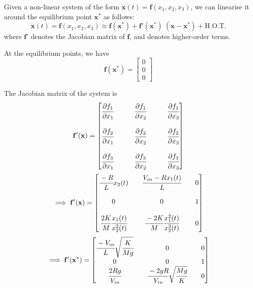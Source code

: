 Given a non-linear system of the form \( \mathbf{\dot x}(t) = \mathbf{f}(x_1, x_2, x_3) \), we can linearise it around the equilibrium point \( \mathbf{x^*} \) as follows:
\[
    \mathbf{\dot x}(t) = \mathbf{f}(x_1, x_2, x_3) \approx \mathbf{f}(\mathbf{x^*}) + \mathbf{f'}(\mathbf{x^*})\; (\mathbf{x} - \mathbf{x^*}) + \text{H.O.T.}
\]
where \(\mathbf{f'}\) denotes the Jacobian matrix of \(\mathbf{f}\), and  denotes higher-order terms.

At the equilibrium points, we have
\[
    \mathbf{f}(\mathbf{x^*}) =
    \begin{bmatrix}
        0 \\
        0 \\
        0
    \end{bmatrix}
\]

The Jacobian matrix of the system is
\[
    \mathbf{f'}(\mathbf{x}) =
    \begin{bmatrix}
        \cfrac{\partial f_1}{\partial x_1} &  &  & \cfrac{\partial f_1}{\partial x_2} &  &  & \cfrac{\partial f_1}{\partial x_3} \\
        \\
        \cfrac{\partial f_2}{\partial x_1} &  &  & \cfrac{\partial f_2}{\partial x_2} &  &  & \cfrac{\partial f_2}{\partial x_3} \\
        \\
        \cfrac{\partial f_3}{\partial x_1} &  &  & \cfrac{\partial f_3}{\partial x_2} &  &  & \cfrac{\partial f_3}{\partial x_3} \\
    \end{bmatrix}
\]
\[
    \implies
    \mathbf{f'}(\mathbf{x}) =
    \begin{bmatrix}
        \cfrac{-R}{L}x_2(t)                    &  & \cfrac{V_{in} - R x_1(t)}{L}              &  & 0 \\
        \\
        0                                      &  & 0                                         &  & 1 \\
        \\
        \cfrac{2K}{M} \cfrac{x_1(t)}{x_2^2(t)} &  & \cfrac{-2K}{M} \cfrac{x_1^2(t)}{x_2^3(t)} &  & 0
    \end{bmatrix}
\]
\[
    \implies
    \mathbf{f'}(\mathbf{x^*}) =
    \begin{bmatrix}
        \cfrac{-V_{in}}{L} \sqrt{\cfrac{K}{Mg}} &  & 0                                        &  & 0 \\
        0                                       &  & 0                                        &  & 1 \\
        \cfrac{2 R g}{V_{in}}                   &  & \cfrac{-2gR}{V_{in}}\sqrt{\cfrac{Mg}{K}} &  & 0
    \end{bmatrix}
\]

